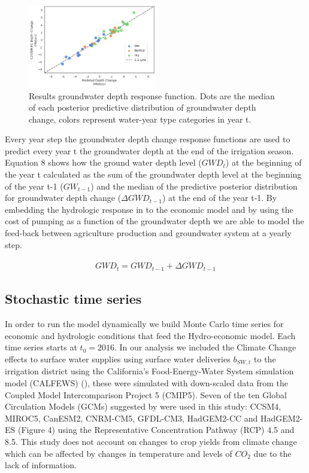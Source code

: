 \documentclass[11pt,a4paper]{article}
\begin{document}
\begin{figure}[H]
    \centering
    \includegraphics[width=0.5\textwidth]{results_gw_depth_response_calib.png}
    \caption{Results groundwater depth response function. Dots are the median of each posterior predictive distribution of groundwater depth change, colors represent water-year type categories in year t.}
    \label{fig:mesh1}
\end{figure}

Every year step the groundwater depth change response functions are used to predict every year t the groundwater depth at the end of the irrigation season. Equation 8 shows how the ground water depth level ($GWD_{t}$) at the beginning of the year t calculated as the sum of the groundwater depth level at the beginning of the year t-1 ($GW_{t-1}$) and the median of the predictive posterior distribution for groundwater depth change ($\overline{\Delta GWD}_{t-1}$) at the end of the year t-1. By embedding the hydrologic response in to the economic model and by using the cost of pumping as a function of the groundwater depth we are able to model the feed-back between agriculture production and groundwater system at a yearly step.

\begin{align}
GWD_{t} = GWD_{t-1} + \overline{\Delta GWD}_{t-1}
\end{align}

\subsection{Stochastic time series}

In order to run the model dynamically we build Monte Carlo time series for economic and hydrologic conditions that feed the Hydro-economic model. Each time series starts at $t_{0}=2016$. In our analysis we included the Climate Change effects to surface water supplies using surface water deliveries $b_{SW,t}$ to the irrigation district using the California’s Food-Energy-Water System simulation model (CALFEWS) (\cite{zeff_californias_2021}), these were simulated with down-scaled data from the Coupled Model Intercomparison Project 5 (CMIP5). Seven of the ten Global Circulation Models (GCMs) suggested by \textcite{pierce_climate_2018} were used in this study: CCSM4, MIROC5, CanESM2, CNRM-CM5, GFDL-CM3, HadGEM2-CC and HadGEM2-ES (Figure 4) using the Representative Concentration Pathway (RCP) 4.5 and 8.5. This study does not account on changes to crop yields from climate change which can be affected by changes in temperature and levels of $CO_{2}$ due to the lack of information. 
\end{document}
